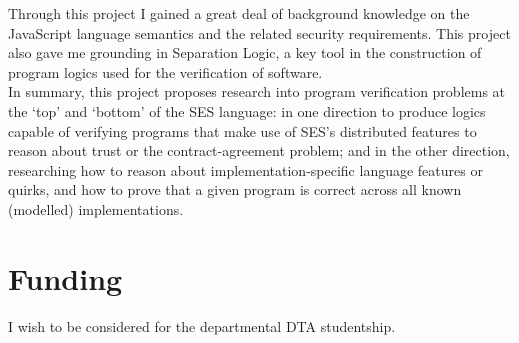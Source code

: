 \documentclass[a4paper]{article}
\begin{document}
Through this project I gained a great deal of background knowledge on the
JavaScript language semantics and the related security requirements. This
project also gave me grounding in Separation Logic, a key tool in
the construction of program logics used for the verification of software.
\\

In summary, this project proposes research into program verification problems at
the `top' and `bottom' of the SES language: in one direction to produce logics
capable of verifying programs that make use of SES's distributed features to
reason about trust or the contract-agreement problem; and in the other direction,
researching how to reason about implementation-specific language features or
quirks, and how to prove that a given program is correct across all known
(modelled) implementations.

\section{Funding}
I wish to be considered for the departmental DTA studentship.
\end{document}
